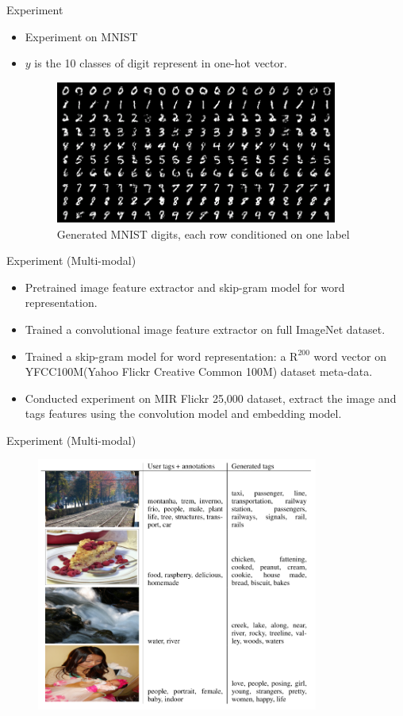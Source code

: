 \documentclass[10pt]{beamer}
\begin{document}
	\begin{frame}{Experiment}
		\begin{itemize}
			\item Experiment on MNIST
			\item $y$ is the 10 classes of digit represent in one-hot vector.
			\begin{figure}
				\caption{Generated MNIST digits, each row conditioned on one label}
				\includegraphics[width=25em]{figures/CGAN-experiment-mnist.png}
			\end{figure}
		\end{itemize}
	\end{frame}

	\begin{frame}{Experiment (Multi-modal)}
		\begin{itemize}
			\item Pretrained image feature extractor and skip-gram model for word representation.
			\item Trained a convolutional image feature extractor on full ImageNet dataset.
			\item Trained a skip-gram model for word representation: a $\mathrm{R}^{200}$ word vector on YFCC100M(Yahoo Flickr Creative Common 100M) dataset meta-data.
			\item Conducted experiment on MIR Flickr 25,000 dataset, extract the image and tags features using the convolution model and embedding model.
		\end{itemize}
	\end{frame}

	\begin{frame}{Experiment (Multi-modal)}
		\begin{figure}
			\includegraphics[width=25em]{figures/CGAN-experiment-multi-modal.png}
		\end{figure}
	\end{frame}
	
\end{document}
